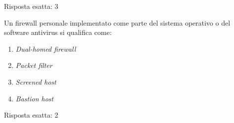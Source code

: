 \begin{Answer} [
  ref={netriep5},
  number={5}
  ]

  \Question Risposta esatta: 3

\end{Answer}


\begin{Exercise} [
  title={Quiz},
  label={netriep6}
  ]

  \Question Un firewall personale implementato come parte del sistema
operativo o del software antivirus si qualifica come:
\begin{enumerate}
 \item \textit{Dual-homed firewall}
 \item \textit{Packet filter}
 \item \textit{Screened host}
 \item \textit{Bastion host}
\end{enumerate}

\end{Exercise}


\begin{Answer} [
  ref={netriep6},
  number={6}
  ]

  \Question Risposta esatta: 2

\end{Answer}
